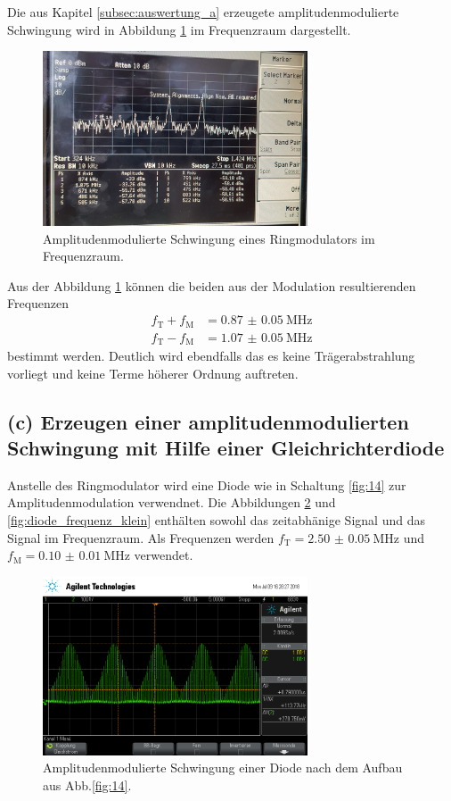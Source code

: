 Die aus Kapitel \ref{subsec:auswertung_a} erzeugete
amplitudenmodulierte Schwingung wird in Abbildung \ref{fig:ringamp_frequenz}
im Frequenzraum dargestellt.
\begin{figure}
  \centering
  \includegraphics[width=0.7\textwidth]{spec/frequenzbereich_klein_ring.jpg}
  \caption{Amplitudenmodulierte
  Schwingung eines Ringmodulators im Frequenzraum.}
  \label{fig:ringamp_frequenz}
\end{figure}
Aus der Abbildung \ref{fig:ringamp_frequenz}
können die beiden aus der Modulation resultierenden Frequenzen
\begin{align}
  f_{\text{T}}+f_{\text{M}}&=\SI{0.87(5)}{\mega\hertz} \\
  f_{\text{T}}-f_{\text{M}}&=\SI{1.07(5)}{\mega\hertz}
\end{align}
bestimmt werden.
Deutlich wird ebendfalls das es keine Trägerabstrahlung vorliegt und
keine Terme höherer Ordnung auftreten.

\subsection{(c) Erzeugen einer amplitudenmodulierten Schwingung
mit Hilfe einer Gleichrichterdiode}
\label{subsec:auswertung_c}
Anstelle des Ringmodulator wird eine Diode wie in Schaltung \ref{fig:14} zur Amplitudenmodulation verwendnet.
Die Abbildungen \ref{fig:diode_zeit} und \ref{fig:diode_frequenz_klein}
enthälten
sowohl das zeitabhänige Signal und das Signal im Frequenzraum.
Als Frequenzen werden $f_{\text{T}}=\SI{2.50(5)}{\mega\hertz}$ und
$f_{\text{M}}=\SI{0.10(1)}{\mega\hertz}$ verwendet.
\begin{figure}
  \centering
  \includegraphics[width=0.7\textwidth]{osci/amp_mod_diode.png}
  \caption{Amplitudenmodulierte
  Schwingung einer Diode nach dem Aufbau aus Abb.\ref{fig:14}.}
  \label{fig:diode_zeit}
\end{figure}

